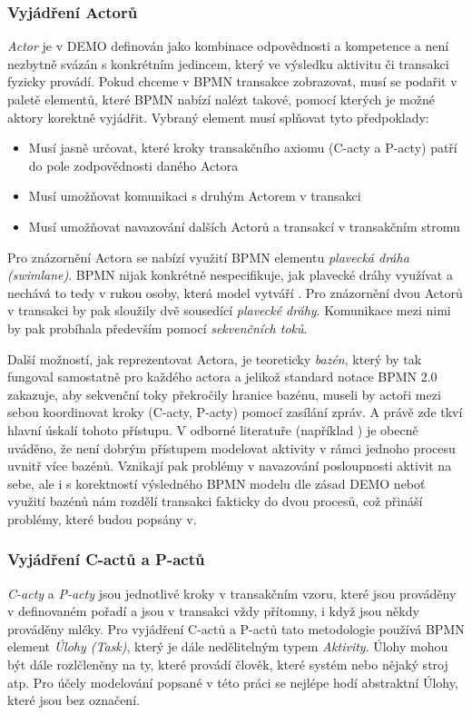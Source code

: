 \documentclass[]{article}
\begin{document}
\subsubsection{Vyjádření Actorů}
\textit{Actor} je v DEMO definován jako kombinace odpovědnosti a kompetence a není nezbytně svázán s konkrétním jedincem, který ve výsledku aktivitu či transakci fyzicky provádí. Pokud chceme v BPMN transakce zobrazovat, musí se podařit v paletě elementů, které BPMN nabízí nalézt takové, pomocí kterých je možné aktory korektně vyjádřit. Vybraný element musí splňovat tyto předpoklady:

\begin{itemize}
\item Musí jasně určovat, které kroky transakčního axiomu (C-acty a P-acty) patří do pole zodpovědnosti daného Actora
\item Musí umožňovat komunikaci s druhým Actorem v transakci
\item Musí umožňovat navazování dalších Actorů a transakcí v transakčním stromu
\end{itemize}

Pro znázornění Actora se nabízí využití BPMN elementu \textit{plavecká dráha (swimlane)}. BPMN nijak konkrétně nespecifikuje, jak plavecké dráhy využívat a nechává to tedy v rukou osoby, která model vytváří \cite{Silver2011}. Pro znázornění dvou Actorů v transakci by pak sloužily dvě sousedící \textit{plavecké dráhy}. Komunikace mezi nimi by pak probíhala především pomocí \textit{sekvenčních toků}.

Další možností, jak reprezentovat Actora, je teoreticky \textit{bazén}, který by tak fungoval samostatně pro každého actora a jelikož standard notace BPMN 2.0 zakazuje, aby sekvenční toky překročily hranice bazénu, museli by actoři mezi sebou koordinovat kroky (C-acty, P-acty) pomocí zasílání zpráv. A právě zde tkví hlavní úskalí tohoto přístupu. V odborné literatuře (například \cite{Silver2011}) je obecně uváděno, že není dobrým přístupem modelovat aktivity v rámci jednoho procesu uvnitř více bazénů. Vznikají pak problémy v navazování posloupnosti aktivit na sebe, ale i s korektností výsledného BPMN modelu dle zásad DEMO neboť využití bazénů nám rozdělí transakci fakticky do dvou procesů, což přináší problémy, které budou popsány v. %

\subsubsection{Vyjádření C-actů a P-actů}
\textit{C-acty} a \textit{P-acty} jsou jednotlivé kroky v transakčním vzoru, které jsou prováděny v definovaném pořadí a jsou v transakci vždy přítomny, i když jsou někdy prováděny mlčky. Pro vyjádření C-actů a P-actů tato metodologie používá BPMN element \textit{Úlohy (Task)}, který je dále nedělitelným typem \textit{Aktivity}. Úlohy mohou být dále rozlčleněny na ty, které provádí člověk, které systém nebo nějaký stroj atp. Pro účely modelování popsané v této práci se nejlépe hodí abstraktní Úlohy, které jsou bez označení. 
\end{document}
